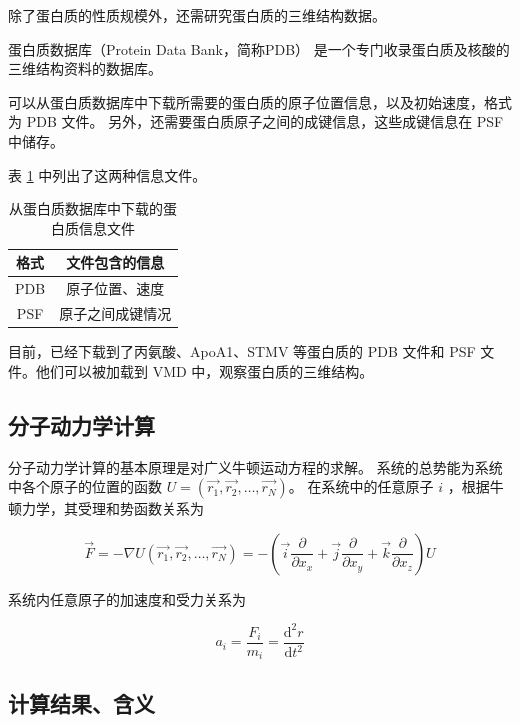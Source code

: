 除了蛋白质的性质规模外，还需研究蛋白质的三维结构数据。

蛋白质数据库（Protein Data Bank，简称PDB）\cite{burley2017protein,sussman1998protein} 是一个专门收录蛋白质及核酸的三维结构资料的数据库。

可以从蛋白质数据库中下载所需要的蛋白质的原子位置信息，以及初始速度，格式为 PDB 文件。
另外，还需要蛋白质原子之间的成键信息，这些成键信息在 PSF 中储存。

表 \ref{tab:protein-files} 中列出了这两种信息文件。

\begin{table}[h]
    \centering
    \caption{从蛋白质数据库中下载的蛋白质信息文件}
    \label{tab:protein-files}
    \begin{tabular}{cc}
        \toprule
        格式  & 文件包含的信息  \\
        \midrule
        PDB & 原子位置、速度  \\
        PSF & 原子之间成键情况 \\
        \bottomrule
    \end{tabular}
\end{table}

目前，已经下载到了丙氨酸、ApoA1、STMV 等蛋白质的 PDB 文件和 PSF 文件。他们可以被加载到 VMD 中，观察蛋白质的三维结构。



\subsection{分子动力学计算}

分子动力学计算的基本原理是对广义牛顿运动方程的求解。
系统的总势能为系统中各个原子的位置的函数 $U = (\vec{r_1}, \vec{r_2}, \dots, \vec{r_N})$。
在系统中的任意原子 $i$ ，根据牛顿力学，其受理和势函数关系为


\begin{equation}
    \vec{F} = -\nabla U (\vec{r_1}, \vec{r_2}, \dots, \vec{r_N}) = - \left( \vec{i} \frac{\partial}{\partial x_x} + \vec{j}\frac{\partial}{\partial x_y} + \vec{k} \frac{\partial}{\partial x_z}\right) U
\end{equation}

系统内任意原子的加速度和受力关系为\cite{易浩杰2019纳米静电喷射的分子动力学模拟研究}

\begin{equation}
    a_i = \frac{F_i}{m_i} = \frac{\mathrm{d}^2 r}{\mathrm{d} t^2}
\end{equation}

\subsection{计算结果、含义}


